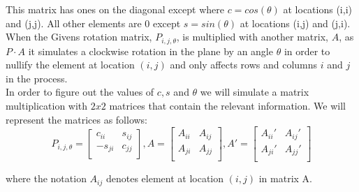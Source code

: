 \documentclass[12pt,twoside]{article}
\begin{document}
This matrix has ones on the diagonal except where $c=cos(\theta)$ at locations (i,i) and (j,j). All other elements are 0 except $s=sin(\theta)$ at locations (i,j) and (j,i).\\

When the Givens rotation matrix, $P_{i,j,\theta}$,  is multiplied with another matrix, $A$, as $P\cdot A$ it simulates a clockwise rotation in the plane by an angle $\theta$ in order to nullify the element at location $(i,j)$ and only affects rows and columns $i$ and $j$ in the process.\\
 

In order to figure out the values of $c,s$ and $\theta$ we will simulate a matrix multiplication with $2x2$ matrices that contain the relevant information. We will represent the matrices as follows:
\begin{equation}
P_{i,j,\theta} = 
\begin{bmatrix}
     c_{ii} & s_{ij} \\
    -s_{ji} & c_{jj} \\
\end{bmatrix}
,A = 
\begin{bmatrix}
     A_{ii} & A_{ij} \\
    A_{ji} & A_{jj} \\
\end{bmatrix}
,A' = 
\begin{bmatrix}
     A_{ii}' & A_{ij}' \\
    A_{ji}' & A_{jj}' \\
\end{bmatrix}
\end{equation}

where the notation $A_{ij}$ denotes element at location $(i,j)$ in matrix A.\\
\end{document}

